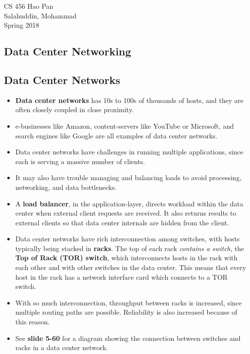 \documentclass{article}
\begin{document}
\noindent
{CS 456 \hfill Hao Pan}\\
{Salahuddin, Mohammad}\\
{Spring 2018}


\begin{center}
\section{Data Center Networking}
\noindent
\end{center}

\subsection{Data Center Networks}

\begin{itemize}
\item {\bf Data center networks} has 10s to 100s of thousands of hosts, and they are often closely coupled in close proximity.
\item e-businesses like Amazon, content-servers like YouTube or Microsoft, and search engines like Google are all examples of data center networks.
\item Data center networks have challenges in running multiple applications, since each is serving a massive number of clients.
\item It may also have trouble managing and balancing loads to avoid processing, networking, and data bottlenecks.
\item A {\bf load balancer}, in the application-layer, directs workload within the data center when external client requests are received. It also returns results to external clients so that data center internals are hidden from the client.
\item Data center networks have rich interconnection among switches, with hosts typically being stacked in {\bf racks}. The top of each rack \emph{contains a switch}, the {\bf Top of Rack (TOR) switch}, which interconnects hosts in the rack with each other and with other switches in the data center. This means that every host in the rack has a network interface card which connects to a TOR switch.
\item With so much interconnection, throughput between racks is increased, since multiple routing paths are possible. Reliability is also increased because of this reason.
\item See {\bf slide 5-60} for a diagram showing the connection between switches and racks in a data center network.
\end{itemize}
\end{document}
